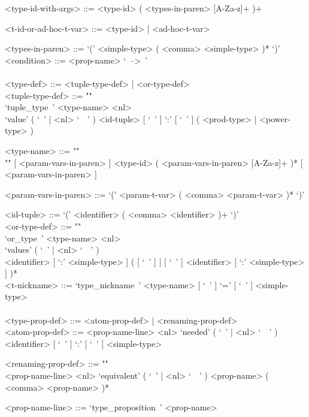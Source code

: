 \documentclass{article}
\begin{document}
\begin{grammar}
<type-id-with-args> ::= <type-id> ( <types-in-paren> [A-Za-z]+ )+

<t-id-or-ad-hoc-t-var> ::= <type-id> | <ad-hoc-t-var>

<types-in-paren> ::= `(' <simple-type> ( <comma> <simple-type> )* `)'
\\

<condition> ::= <prop-name> `\ -->\ ' 
\\
\\

<type-def> ::= <tuple-type-def> | <or-type-def>
\\

<tuple-type-def> ::= ""\\
`tuple_type\ ' <type-name> <nl> \\
`value' ( `\ ' | <nl> `\ \ ' )
<id-tuple> [ `\ ' ] `:' [ `\ ' ] ( <prod-type> | <power-type> )

<type-name> ::= ""\\""
[ <param-vars-in-paren> ] <type-id> ( <param-vars-in-paren> [A-Za-z]+ )*
[ <param-vars-in-paren> ]

<param-vars-in-paren> ::= `(' <param-t-var> ( <comma> <param-t-var> )* `)'

<id-tuple> ::= `(' <identifier> ( <comma> <identifier> )+ `)'
\\

<or-type-def> ::= ""\\
`or_type\ ' <type-name> <nl> \\
`values' ( `\ ' | <nl> `\ \ ' ) \\ 
<identifier> [ `:' <simple-type> ]
( [ `\ ' ] | [ `\ ' ] <identifier> [ `:' <simple-type> ] )*
\\

<t-nickname> ::= `type_nickname\ ' <type-name> [ `\ ' ] `=' [ `\ ' ] <simple-type>
\\\\

<type-prop-def> ::= <atom-prop-def> | <renaming-prop-def>
\\

<atom-prop-def> ::=
<prop-name-line> <nl>
`needed' ( `\ ' | <nl> `\ \ ' ) <identifier> [ `\ ' ] `:' [ `\ ' ] <simple-type>

<renaming-prop-def> ::= ""\\
<prop-name-line> <nl>
`equivalent' ( `\ ' | <nl> `\ \ ' ) <prop-name> ( <comma> <prop-name> )*

<prop-name-line> ::= `type_proposition\ ' <prop-name>


\end{grammar}
\end{document}
